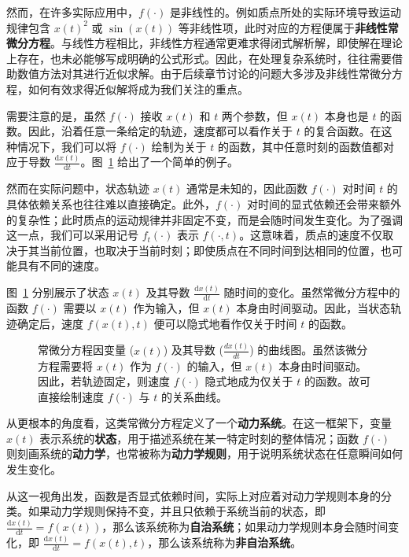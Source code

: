 \documentclass[UTF8,a4paper,zihao=-4,oneside,openany]{ctexbook}
\makeatletter
\newcommand{\AMLFigure}[2][0.96\linewidth]{%
  \begingroup
  \let\AtBeginDocument\@gobble
  \endgroup
}
\makeatother
\begin{document}
然而，在许多实际应用中，\(f(\cdot)\) 是非线性的。例如质点所处的实际环境导致运动规律包含 \(x(t)^2\) 或 \(\sin(x(t))\) 等非线性项，此时对应的方程便属于\textbf{非线性常微分方程}。与线性方程相比，非线性方程通常更难求得闭式解析解，即使解在理论上存在，也未必能够写成明确的公式形式。因此，在处理复杂系统时，往往需要借助数值方法对其进行近似求解。由于后续章节讨论的问题大多涉及非线性常微分方程，如何有效求得近似解将成为我们关注的重点。 

需要注意的是，虽然 \(f(\cdot)\) 接收 \(x(t)\) 和 \(t\) 两个参数，但 \(x(t)\) 本身也是 \(t\) 的函数。因此，沿着任意一条给定的轨迹，速度都可以看作关于 \(t\) 的复合函数。在这种情况下，我们可以将 \(f(\cdot)\) 绘制为关于 \(t\) 的函数，其中任意时刻的函数值都对应于导数 \(\frac{\mathrm{d}x(t)}{\mathrm{d}t}\)。图~\ref{fig:curve-of-an-ode} 给出了一个简单的例子。

然而在实际问题中，状态轨迹 \(x(t)\) 通常是未知的，因此函数 \(f(\cdot)\) 对时间 \(t\) 的具体依赖关系也往往难以直接确定。此外，\(f(\cdot)\) 对时间的显式依赖还会带来额外的复杂性；此时质点的运动规律并非固定不变，而是会随时间发生变化。为了强调这一点，我们可以采用记号 \(f_t(\cdot)\) 表示 \(f(\cdot,t)\)。这意味着，质点的速度不仅取决于其当前位置，也取决于当前时刻；即使质点在不同时间到达相同的位置，也可能具有不同的速度。

图~\ref{fig:curve-of-an-ode} 分别展示了状态 \(x(t)\) 及其导数 \(\frac{\mathrm{d}x(t)}{\mathrm{d}t}\) 随时间的变化。虽然常微分方程中的函数 \(f(\cdot)\) 需要以 \(x(t)\) 作为输入，但 \(x(t)\) 本身由时间驱动。因此，当状态轨迹确定后，速度 \(f(x(t),t)\) 便可以隐式地看作仅关于时间 \(t\) 的函数。

\begin{figure}[!t]
\centering
\AMLFigure{figure-ode-example-curves}
\caption{常微分方程因变量 ($x(t)$) 及其导数 ($\frac{d x(t)}{d t}$) 的曲线图。虽然该微分方程需要将 $x(t)$ 作为 $f(\cdot)$ 的输入，但 $x(t)$ 本身由时间驱动。因此，若轨迹固定，则速度 $f(\cdot)$ 隐式地成为仅关于 $t$ 的函数。故可直接绘制速度 $f(\cdot)$ 与 $t$ 的关系曲线。}
\label{fig:curve-of-an-ode}
\end{figure}

从更根本的角度看，这类常微分方程定义了一个\textbf{动力系统}。在这一框架下，变量 \(x(t)\) 表示系统的\textbf{状态}，用于描述系统在某一特定时刻的整体情况；函数 \(f(\cdot)\) 则刻画系统的\textbf{动力学}，也常被称为\textbf{动力学规则}，用于说明系统状态在任意瞬间如何发生变化。

从这一视角出发，函数是否显式依赖时间，实际上对应着对动力学规则本身的分类。如果动力学规则保持不变，并且只依赖于系统当前的状态，即 \(\frac{\mathrm{d}x(t)}{\mathrm{d}t}=f(x(t))\)，那么该系统称为\textbf{自治系统}；如果动力学规则本身会随时间变化，即 \(\frac{\mathrm{d}x(t)}{\mathrm{d}t}=f(x(t),t)\)，那么该系统称为\textbf{非自治系统}。
\end{document}
